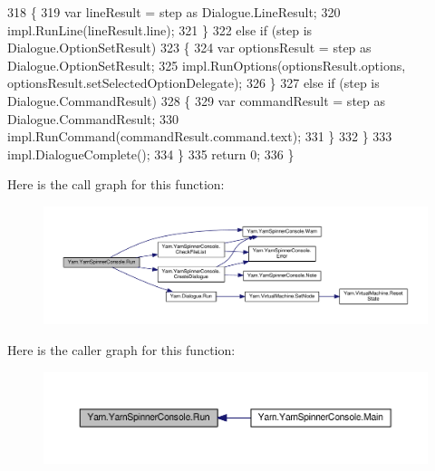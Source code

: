 \begin{DoxyCode}
318                     \{
319                         var lineResult = step as Dialogue.LineResult;
320                         impl.RunLine(lineResult.line);
321                     \}
322                     \textcolor{keywordflow}{else} \textcolor{keywordflow}{if} (step is Dialogue.OptionSetResult)
323                     \{
324                         var optionsResult = step as Dialogue.OptionSetResult;
325                         impl.RunOptions(optionsResult.options, optionsResult.setSelectedOptionDelegate);
326                     \}
327                     \textcolor{keywordflow}{else} \textcolor{keywordflow}{if} (step is Dialogue.CommandResult)
328                     \{
329                         var commandResult = step as Dialogue.CommandResult;
330                         impl.RunCommand(commandResult.command.text);
331                     \}
332                 \}
333                 impl.DialogueComplete();
334             \}
335             \textcolor{keywordflow}{return} 0;
336         \}
\end{DoxyCode}


Here is the call graph for this function\-:
\nopagebreak
\begin{figure}[H]
\begin{center}
\leavevmode
\includegraphics[width=350pt]{a00197_a1b974c55540795a9e643c2ec055fbd51_cgraph}
\end{center}
\end{figure}




Here is the caller graph for this function\-:
\nopagebreak
\begin{figure}[H]
\begin{center}
\leavevmode
\includegraphics[width=350pt]{a00197_a1b974c55540795a9e643c2ec055fbd51_icgraph}
\end{center}
\end{figure}


